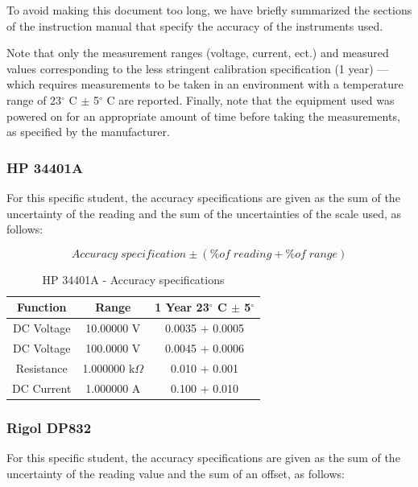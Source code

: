 \documentclass[../main.tex]{subfiles}
\begin{document}
To avoid making this document too long, we have briefly summarized the sections of the instruction manual that specify the accuracy of the instruments used.

Note that only the measurement ranges (voltage, current, ect.) and measured values corresponding to the less stringent calibration specification (1 year) — which requires measurements to be taken in an environment with a temperature range of 23$^\circ$ C $\pm$ 5$^\circ$ C are reported. Finally, note that the equipment used was powered on for an appropriate amount of time before taking the measurements, as specified by the manufacturer.

\subsubsection*{HP 34401A}

For this specific student, the accuracy specifications are given as the sum of the uncertainty of the reading and the sum of the uncertainties of the scale used, as follows:

\[ \unit{Accuracy \; specification} \pm (\% \unit{of \; reading} + \% \unit{of \; range} )\]

\begin{table}[h]
\begin{center}

\begin{tabular}{c c  c}
\textbf{Function} & \textbf{Range} & \textbf{1 Year 23$^\circ$ C $\pm$ 5$^\circ$} \\
\hline
DC Voltage & 10.00000 V &  0.0035 + 0.0005\\
\hline
DC Voltage & 100.0000 V & 0.0045 + 0.0006 \\
\hline
Resistance & 1.000000 k$\Omega$ & 0.010 + 0.001 \\
\hline
DC Current & 1.000000 A & 0.100 + 0.010\\
\hline
\end{tabular}
\caption{HP 34401A - Accuracy specifications}
\end{center}
\end{table}

\subsubsection*{Rigol DP832}

For this specific student, the accuracy specifications are given as the sum of the uncertainty of the reading value and the sum of an offset, as follows:
\end{document}

